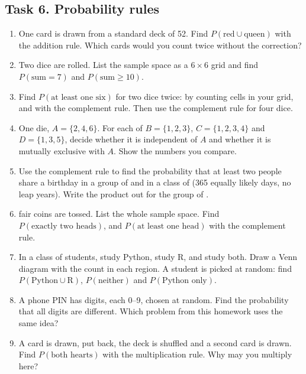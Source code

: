 \subsection*{Task 6. Probability rules}
\begin{enumerate}[label=(\alph*)]
  \item One card is drawn from a standard deck of 52. Find $P(\text{red} \cup \text{queen})$ with the addition rule.
        Which cards would you count twice without the correction?
  \item Two dice are rolled. List the sample space as a $6 \times 6$ grid and find $P(\text{sum} = 7)$ and
        $P(\text{sum} \ge 10)$.
  \item Find $P(\text{at least one six})$ for two dice twice: by counting cells in your grid, and with the complement
        rule. Then use the complement rule for four dice.
  \item One die, $A = \{2,4,6\}$. For each of $B=\{1,2,3\}$, $C=\{1,2,3,4\}$ and $D=\{1,3,5\}$, decide whether it is
        independent of $A$ and whether it is mutually exclusive with $A$. Show the numbers you compare.
  \item Use the complement rule to find the probability that at least two people share a birthday in a group of
        \hwBdayA{} and in a class of \hwBdayB{} (365 equally likely days, no leap years). Write the product out for the
        group of \hwBdayA.
  \item \hwCoins{} fair coins are tossed. List the whole sample space. Find $P(\text{exactly two heads})$, and
        $P(\text{at least one head})$ with the complement rule.
  \item In a class of \hwClass{} students, \hwPython{} study Python, \hwR{} study R, and \hwBoth{} study both. Draw a
        Venn diagram with the count in each region. A student is picked at random: find $P(\text{Python} \cup
        \text{R})$, $P(\text{neither})$ and $P(\text{Python only})$.
  \item A phone PIN has \hwPin{} digits, each 0--9, chosen at random. Find the probability that all \hwPin{} digits are
        different. Which problem from this homework uses the same idea?
  \item A card is drawn, put back, the deck is shuffled and a second card is drawn. Find $P(\text{both hearts})$ with
        the multiplication rule. Why may you multiply here?
\end{enumerate}

